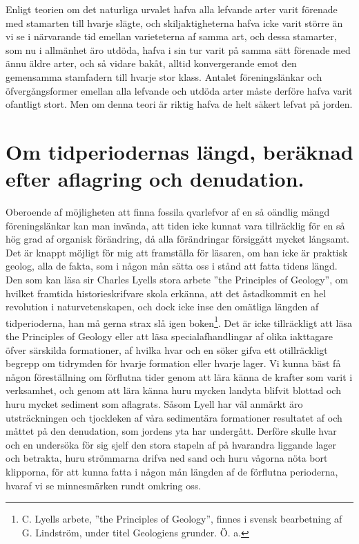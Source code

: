 Enligt teorien om det naturliga urvalet hafva alla lefvande arter varit förenade med stamarten till hvarje slägte, och skiljaktigheterna hafva icke varit större än vi se i närvarande tid emellan varieteterna af samma art, och dessa stamarter, som nu i allmänhet äro utdöda, hafva i sin tur varit på samma sätt förenade med ännu äldre arter, och så vidare bakåt, alltid konvergerande emot den gemensamma stamfadern till hvarje stor klass. Antalet föreningslänkar och öfvergångsformer emellan alla lefvande och utdöda arter måste derföre hafva varit ofantligt stort. Men om denna teori är riktig hafva de helt säkert lefvat på jorden.



\section[Om tidsperiodernas längd]{Om tidperiodernas längd, beräknad efter aflagring
och denudation.}

Oberoende af möjligheten att finna fossila qvarlefvor af en så oändlig mängd föreningslänkar kan man invända, att tiden icke kunnat vara tillräcklig för en så hög grad af organisk förändring, då alla förändringar försiggått mycket långsamt. Det är knappt möjligt för mig att framställa för läsaren, om han icke är praktisk geolog, alla de fakta, som i någon mån sätta oss i stånd att fatta tidens längd. Den som kan läsa sir Charles Lyells stora arbete ”the Principles of Geology”, om hvilket framtida historieskrifvare skola erkänna, att det åstadkommit en hel revolution i naturvetenskapen, och dock icke inse den omätliga längden af tidperioderna, han må gerna strax slå igen boken\footnote{C. Lyells arbete, ”the Principles of Geology”, finnes i svensk bearbetning af G. Lindström, under titel Geologiens grunder. Ö. a.}. Det är icke tillräckligt att läsa the Principles of Geology eller att läsa specialafhandlingar af olika iakttagare öfver särskilda formationer, af hvilka hvar och en söker gifva ett otillräckligt begrepp om tidrymden för hvarje formation eller hvarje lager. Vi kunna bäst få någon föreställning om förflutna tider genom att lära känna de krafter som varit i verksamhet, och genom att lära känna huru mycken landyta blifvit blottad och huru mycket sediment som aflagrats. Såsom Lyell har väl anmärkt äro utsträckningen och tjockleken af våra sedimentära formationer resultatet af och måttet på den denudation, som jordens yta har undergått. Derföre skulle hvar och en undersöka för sig sjelf den stora stapeln af på hvarandra liggande lager och betrakta, huru strömmarna drifva ned sand och huru vågorna nöta bort klipporna, för att kunna fatta i någon mån längden af de förflutna perioderna, hvaraf vi se minnesmärken rundt omkring oss.


